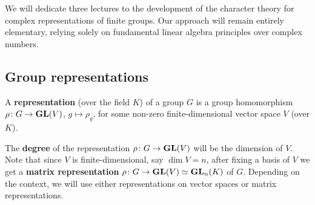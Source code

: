 \section{}

We will dedicate three lectures to the development of the character theory for complex representations 
of finite groups. Our approach will remain entirely elementary, 
relying solely on fundamental linear algebra principles over complex numbers.

\subsection{Group representations}

\begin{definition}
	A \textbf{representation} (over the field $K$) of a group $G$ is a group homomorphism
	$\rho\colon G\to\mathbf{GL}(V)$, $g\mapsto\rho_g$, for some non-zero finite-dimensional 
        vector space $V$ (over $K$).
\end{definition}

The \textbf{degree} of the representation $\rho\colon G\to\mathbf{GL}(V)$ will be the dimension of $V$. Note that
since $V$ is finite-dimensional, say $\dim V=n$, after fixing a basis of $V$ we get a \textbf{matrix representation} 
$\rho\colon G\to\mathbf{GL}(V)\simeq\mathbf{GL}_n(K)$ of $G$. Depending on the context, we will use either representations on vector spaces or matrix representations.  

